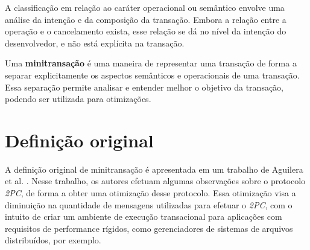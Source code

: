 \documentclass[11pt,twoside,a4paper]{book}
\begin{document}
A classificação em relação ao caráter operacional ou semântico envolve uma análise da intenção e da composição da transação.
Embora a relação entre a operação e o cancelamento exista, esse relação se dá no nível da intenção do desenvolvedor, e não está explícita na transação.

Uma \textbf{minitransação} é uma maneira de representar uma transação de forma a separar explicitamente os aspectos semânticos e operacionais de uma transação. Essa separação permite analisar e entender melhor o objetivo da transação, podendo ser utilizada para otimizações.





\section{Definição original}
\label{sec:minitransacao_original}
A definição original de minitransação é apresentada em um trabalho de Aguilera et al. \cite{sinfonia}. Nesse trabalho, os autores efetuam algumas observações sobre o protocolo \emph{2PC}, de forma a obter uma otimização desse protocolo. Essa otimização visa a diminuição na quantidade de mensagens utilizadas para efetuar o \emph{2PC}, com o intuito de criar um ambiente de execução transacional para aplicações com requisitos de performance rígidos, como gerenciadores de sistemas de arquivos distribuídos, por exemplo. 
\end{document}
